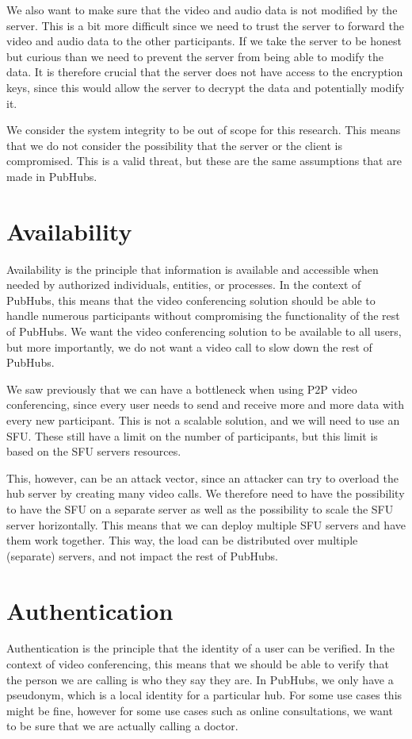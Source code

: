 \documentclass{report}
\begin{document}
We also want to make sure that the video and audio data is not modified by the server. This is a bit more difficult
since we need to trust the server to forward the video and audio data to the other participants. If we take the server
to be honest but curious than we need to prevent the server from being able to modify the data. It is therefore crucial
that the server does not have access to the encryption keys, since this would allow the server to decrypt the data and
potentially modify it.

We consider the system integrity to be out of scope for this research. This means that we do not consider the
possibility that the server or the client is compromised. This is a valid threat, but these are the same assumptions
that are made in PubHubs.

\section{Availability}
Availability is the principle that information is available and accessible when needed by authorized individuals,
entities, or processes. In the context of PubHubs, this means that the video conferencing solution should be able to
handle numerous participants without compromising the functionality of the rest of PubHubs. We want the
video conferencing solution to be available to all users, but more importantly, we do not want a video call to slow
down the rest of PubHubs.

We saw previously that we can have a bottleneck when using P2P video conferencing, since every user needs to send
and receive more and more data with every new participant. This is not a scalable solution, and we will need to use
an SFU. These still have a limit on the number of participants, but this limit is based on the SFU servers resources.

This, however, can be an attack vector, since an attacker can try to overload the hub server by creating many video
calls. We therefore need to have the possibility to have the SFU on a separate server as well as the possibility to
scale the SFU server horizontally. This means that we can deploy multiple SFU servers and have them work together.
This way, the load can be distributed over multiple (separate) servers, and not impact the rest of PubHubs.

\section{Authentication}
Authentication is the principle that the identity of a user can be verified. In the context of video conferencing,
this means that we should be able to verify that the person we are calling is who they say they are. In PubHubs, we
only have a pseudonym, which is a local identity for a particular hub. For some use cases this might be fine, however
for some use cases such as online consultations, we want to be sure that we are actually calling a doctor.
\end{document}
